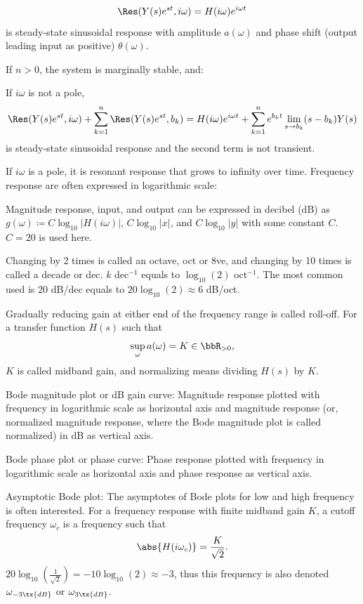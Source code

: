 \documentclass[a4paper,12pt]{report}
\begin{document}
\[\Res(Y(s)e^{st},i\omega)=H(i\omega)e^{i\omega t}\]
is steady-state sinusoidal response with amplitude $a(\omega)$ and phase shift (output leading input as positive) $\theta(\omega)$.
\item If $n>0$, the system is marginally stable, and:
\bit
\item If $i\omega$ is not a pole,
\[\Res(Y(s)e^{st},i\omega)+\sum_{k=1}^n\Res(Y(s)e^{st},b_k)=H(i\omega)e^{i\omega t}+\sum_{k=1}^ne^{b_kt}\lim_{s\to b_k}(s-b_k)Y(s)\]
is steady-state sinusoidal response and the second term is not transient.
\item If $i\omega$ is a pole, it is resonant response that grows to infinity over time.
\eit
\eit
{}
Frequency response are often expressed in logarithmic scale:
\bit
\item Magnitude response, input, and output can be expressed in decibel (dB) as $g(\omega)\coloneq C\log_{10}|H(i\omega)|$, $C\log_{10}|x|$, and $C\log_{10}|y|$ with some constant $C$. $C=20$ is used here.
\item Changing by 2 times is called an octave, oct or 8ve, and changing by 10 times is called a decade or dec. $k$ dec$^{-1}$ equals to $\log_{10}(2)$ oct$^{-1}$. The most common used is $20$ dB/dec equals to $20\log_{10}(2)\approx 6$ dB/oct.
\item Gradually reducing gain at either end of the frequency range is called roll-off.
\eit
{}
For a transfer function $H(s)$ such that
\[\sup_{\omega}a(\omega)=K\in\bbR_{>0},\]
$K$ is called midband gain, and normalizing means dividing $H(s)$ by $K$.
\bit
\item Bode magnitude plot or dB gain curve: Magnitude response plotted with frequency in logarithmic scale as horizontal axis and magnitude response (or, normalized magnitude response, where the Bode magnitude plot is called normalized) in dB as vertical axis.
\item Bode phase plot or phase curve: Phase response plotted with frequency in logarithmic scale as horizontal axis and phase response as vertical axis.
\item Asymptotic Bode plot: The asymptotes of Bode plots for low and high frequency is often interested.
\eit
{}
For a frequency response with finite midband gain $K$, a cutoff frequency $\omega_c$ is a frequency such that
\[\abs{H(i\omega_c)}=\frac{K}{\sqrt{2}}.\]
$20\log_{10}(\frac{1}{\sqrt{2}})=-10\log_{10}(2)\approx -3$, thus this frequency is also denoted $\omega_{-3\tx{dB}}$ or $\omega_{3\tx{dB}}$.
\end{document}
